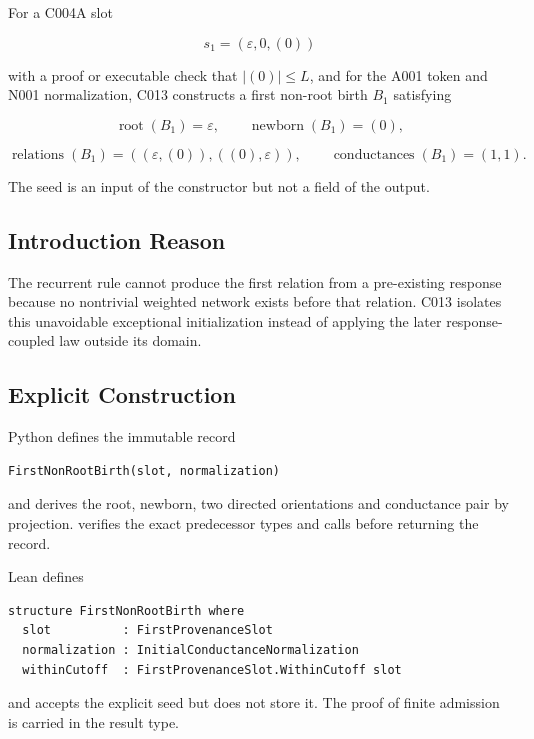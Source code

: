 For a C004A slot

\[
s_1=(\varepsilon,0,(0))
\]

with a proof or executable check that \(|(0)|\le L\), and for the A001
token and N001 normalization, C013 constructs a first non-root birth
\(B_1\) satisfying

\[
\operatorname{root}(B_1)=\varepsilon,
\qquad
\operatorname{newborn}(B_1)=(0),
\]

\[
\operatorname{relations}(B_1)=((\varepsilon,(0)),((0),\varepsilon)),
\qquad
\operatorname{conductances}(B_1)=(1,1).
\]

The seed is an input of the constructor but not a field of the output.

\subsection{Introduction Reason}\label{introduction-reason-10}

The recurrent rule cannot produce the first relation from a pre-existing
response because no nontrivial weighted network exists before that
relation. C013 isolates this unavoidable exceptional initialization
instead of applying the later response-coupled law outside its domain.

\subsection{Explicit Construction}\label{explicit-construction-3}

Python defines the immutable record

\begin{verbatim}
FirstNonRootBirth(slot, normalization)
\end{verbatim}

and derives the root, newborn, two directed orientations and conductance
pair by projection. \texttt{\protect{}} verifies the
exact predecessor types and calls
\texttt{\protect{}} before returning the record.

Lean defines

\begin{verbatim}
structure FirstNonRootBirth where
  slot          : FirstProvenanceSlot
  normalization : InitialConductanceNormalization
  withinCutoff  : FirstProvenanceSlot.WithinCutoff slot
\end{verbatim}

and \texttt{\protect{}} accepts the explicit seed but does
not store it. The proof of finite admission is carried in the result
type.

